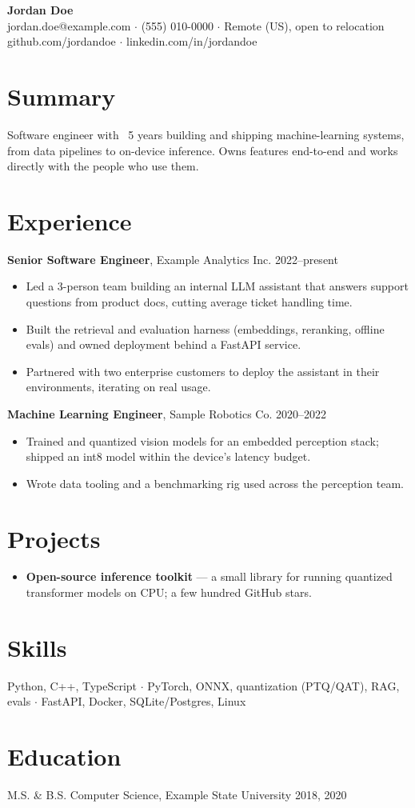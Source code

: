\documentclass[10pt,letterpaper]{article}
\begin{document}
\begin{center}
  {\LARGE\bfseries Jordan Doe}\\[2pt]
  jordan.doe@example.com $\cdot$ (555) 010-0000 $\cdot$ Remote (US), open to relocation\\
  github.com/jordandoe $\cdot$ linkedin.com/in/jordandoe
\end{center}

\section*{Summary}
Software engineer with ~5 years building and shipping machine-learning systems,
from data pipelines to on-device inference. Owns features end-to-end and works
directly with the people who use them.

\section*{Experience}
\textbf{Senior Software Engineer}, Example Analytics Inc. \hfill 2022--present
\begin{itemize}
  \item Led a 3-person team building an internal LLM assistant that answers support questions from product docs, cutting average ticket handling time.
  \item Built the retrieval and evaluation harness (embeddings, reranking, offline evals) and owned deployment behind a FastAPI service.
  \item Partnered with two enterprise customers to deploy the assistant in their environments, iterating on real usage.
\end{itemize}

\textbf{Machine Learning Engineer}, Sample Robotics Co. \hfill 2020--2022
\begin{itemize}
  \item Trained and quantized vision models for an embedded perception stack; shipped an int8 model within the device's latency budget.
  \item Wrote data tooling and a benchmarking rig used across the perception team.
\end{itemize}

\section*{Projects}
\begin{itemize}
  \item \textbf{Open-source inference toolkit} --- a small library for running quantized transformer models on CPU; a few hundred GitHub stars.
\end{itemize}

\section*{Skills}
Python, C++, TypeScript $\cdot$ PyTorch, ONNX, quantization (PTQ/QAT), RAG, evals $\cdot$ FastAPI, Docker, SQLite/Postgres, Linux

\section*{Education}
M.S. \& B.S. Computer Science, Example State University \hfill 2018, 2020
\end{document}
